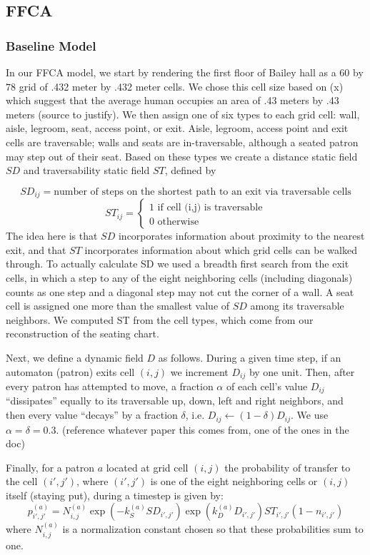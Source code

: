 \documentclass[14pt]{article}
\theoremstyle{definition}
\begin{document}
\subsection{FFCA}
\subsubsection{Baseline Model}
In our FFCA model, we start by rendering the first floor of Bailey hall as a $60$ by $78$ grid of .432 meter by .432 meter cells.
We chose this cell size based on (x) which suggest that the average human occupies an area of .43 meters by .43 meters (source to justify).
We then assign one of six types to each grid cell: wall, aisle, legroom, seat, access point, or exit. Aisle, legroom, access point and exit cells are traversable; walls and seats are in-traversable, although a seated patron may step out of their seat. Based on these types we create a distance static field $SD$ and traversability static field $ST$, defined by

$$SD_{ij} = \text{number of steps on the shortest path to an exit via traversable cells}$$
$$ST_{ij} = \begin{cases}
    1 \text{ if cell (i,j) is traversable}\\
    0 \text{ otherwise}
\end{cases}$$
The idea here is that $SD$ incorporates information about proximity to the nearest exit, and that $ST$ incorporates information about which grid cells can be walked through. To actually calculate SD we used a breadth first search from the exit cells, in which a step to any of the eight neighboring cells (including diagonals) counts as one step and a diagonal step may not cut the corner of a wall. A seat cell is assigned one more than the smallest value of $SD$ among its traversable neighbors. We computed ST from the cell types, which come from our reconstruction of the seating chart.

Next, we define a dynamic field $D$ as follows. During a given time step, if an automaton (patron) exits cell $(i,j)$ we increment $D_{ij}$ by one unit. Then, after every patron has attempted to move, a fraction $\alpha$ of each cell's value $D_{ij}$ ``dissipates'' equally to its traversable up, down, left and right neighbors, and then every value ``decays'' by a fraction $\delta$, i.e. $D_{ij} \gets (1 - \delta) D_{ij}$. We use $\alpha = \delta = 0.3$. (reference whatever paper this comes from, one of the ones in the doc)

Finally, for a patron $a$ located at grid cell $(i,j)$ the probability of transfer to the cell $(i', j')$, where $(i',j')$ is one of the eight neighboring cells or $(i,j)$ itself (staying put), during a timestep is given by:
\begin{equation}\label{eq:trans_prob_simple}
    p^{(a)}_{i', j'} = N_{i,j}^{(a)}\exp(-k^{(a)}_{S}SD_{i',j'})\exp(k^{(a)}_DD_{i',j'})ST_{i',j'}(1 - n_{i' ,j'})
\end{equation}
where $N_{i,j}^{(a)}$ is a normalization constant chosen so that these probabilities sum to one.
\end{document}
